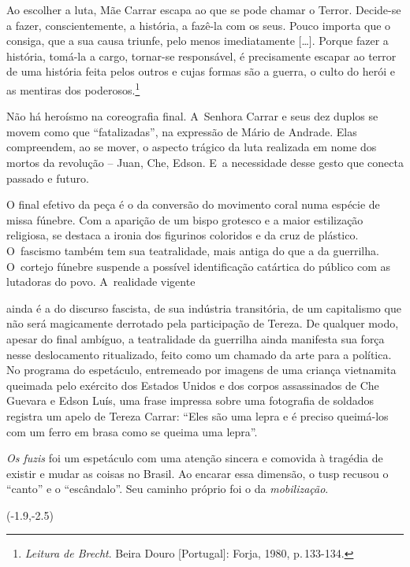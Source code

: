 \startblockquote
Ao escolher a luta, Mãe Carrar escapa ao que se pode chamar o Terror.
Decide-se a fazer, conscientemente, a história, a fazê-la com os seus.
Pouco importa que o consiga, que a sua causa triunfe, pelo menos
imediatamente {[}\ldots{]}. Porque fazer a história, tomá-la a cargo,
tornar-se responsável, é precisamente escapar ao terror de uma história
feita pelos outros e cujas formas são a guerra, o culto do herói e as
mentiras dos poderosos.\footnote{{\it Leitura de Brecht}. Beira Douro
  {[}Portugal{]}: Forja, 1980, p.\,133-134.}
\stopblockquote

Não há heroísmo na coreografia final. A~Senhora Carrar e seus dez duplos
se movem como que “fatalizadas”, na expressão de Mário de Andrade. Elas
compreendem, ao se mover, o aspecto trágico da luta realizada em nome
dos mortos da revolução -- Juan, Che, Edson. E~a necessidade desse gesto
que conecta passado e futuro.

O final efetivo da peça é o da conversão do movimento coral numa espécie
de missa fúnebre. Com a aparição de um bispo grotesco e a maior
estilização religiosa, se destaca a ironia dos figurinos coloridos e da
cruz de plástico. O~fascismo também tem sua teatralidade, mais antiga do
que a da guerrilha. O~cortejo fúnebre suspende a possível identificação
catártica do público com as lutadoras do povo. A~realidade vigente

\column

\noindent{}ainda
é a do discurso fascista, de sua indústria transitória, de um
capitalismo que não será magicamente derrotado pela participação de
Tereza. De qualquer modo, apesar do final ambíguo, a teatralidade da
guerrilha ainda manifesta sua força nesse deslocamento ritualizado,
feito como um chamado da arte para a política. No programa do
espetáculo, entremeado por imagens de uma criança vietnamita queimada
pelo exército dos Estados Unidos e dos corpos assassinados de Che
Guevara e Edson Luís, uma frase impressa sobre uma fotografia de
soldados registra um apelo de Tereza Carrar: “Eles são uma lepra e é
preciso queimá-los com um ferro em brasa como se queima uma lepra”.

{\it Os fuzis} foi um espetáculo com uma atenção sincera e comovida à
tragédia de existir e mudar as coisas no Brasil. Ao encarar essa
dimensão, o {\sc tusp} recusou o “canto” e o “escândalo”. Seu caminho próprio
foi o da {\it mobilização}.

\startpositioning
   \position(-1.9,-2.5){}
\stoppositioning   

